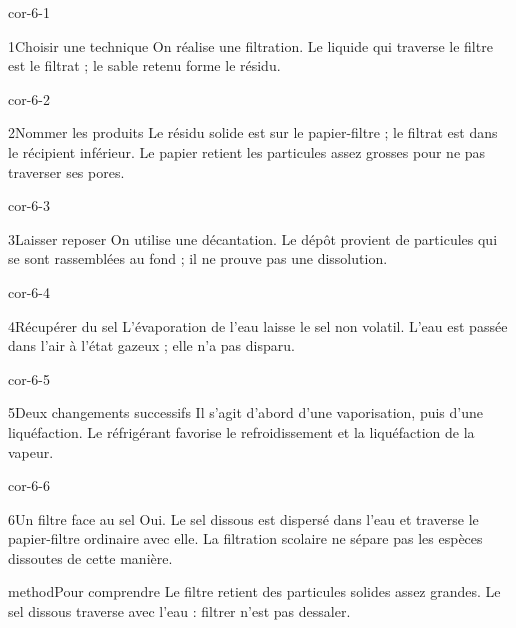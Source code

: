 \documentclass[12pt,twoside,openany]{book}
\begin{document}
\clearpage{}
\begin{blocLivre}{cor-6-1}
\begin{corrige}{1}{Choisir une technique}
On réalise une filtration. Le liquide qui traverse le filtre est le filtrat ; le sable retenu forme le résidu.\par
\end{corrige}\end{blocLivre}
\begin{blocLivre}{cor-6-2}
\begin{corrige}{2}{Nommer les produits}
Le résidu solide est sur le papier-filtre ; le filtrat est dans le récipient inférieur. Le papier retient les particules assez grosses pour ne pas traverser ses pores.\par
{}
\end{corrige}\end{blocLivre}
\begin{blocLivre}{cor-6-3}
\begin{corrige}{3}{Laisser reposer}
On utilise une décantation. Le dépôt provient de particules qui se sont rassemblées au fond ; il ne prouve pas une dissolution.\par
\end{corrige}\end{blocLivre}
\begin{blocLivre}{cor-6-4}
\begin{corrige}{4}{Récupérer du sel}
L’évaporation de l’eau laisse le sel non volatil. L’eau est passée dans l’air à l’état gazeux ; elle n’a pas disparu.\par
\end{corrige}\end{blocLivre}
\begin{blocLivre}{cor-6-5}
\begin{corrige}{5}{Deux changements successifs}
Il s’agit d’abord d’une vaporisation, puis d’une liquéfaction. Le réfrigérant favorise le refroidissement et la liquéfaction de la vapeur.\par
\end{corrige}\end{blocLivre}
\begin{blocLivre}{cor-6-6}
\begin{corrige}{6}{Un filtre face au sel}
Oui. Le sel dissous est dispersé dans l’eau et traverse le papier-filtre ordinaire avec elle. La filtration scolaire ne sépare pas les espèces dissoutes de cette manière.\par
\begin{pcEncadre}{method}{Pour comprendre}
Le filtre retient des particules solides assez grandes. Le sel dissous traverse avec l’eau : filtrer n’est pas dessaler.\par
\end{pcEncadre}
\end{corrige}\end{blocLivre}
\end{document}
